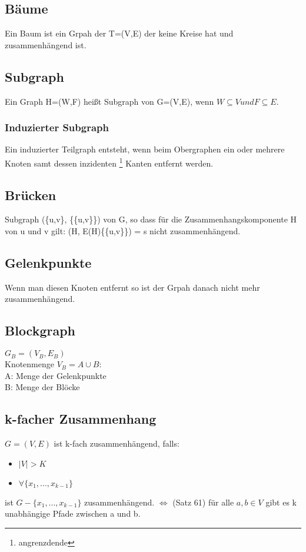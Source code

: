 \documentclass[12pt, letterpaper, twoside]{article}
\begin{document}
\subsection{Bäume}
Ein Baum ist ein Grpah der T=(V,E) der keine Kreise hat und zusammenhängend ist. 

\subsection{Subgraph}
Ein Graph H=(W,F) heißt Subgraph von G=(V,E), wenn $ W \subseteq V und F \subseteq E $.

\subsubsection{Induzierter Subgraph}
Ein induzierter Teilgraph entsteht, wenn beim Obergraphen ein oder mehrere Knoten samt dessen inzidenten \footnote{angrenzdende} Kanten entfernt werden. 

\subsection{Brücken}
Subgraph (\{u,v\}, \{\{u,v\}\}) von G, so dass für die Zusammenhangskomponente H von u und v gilt: (H, E(H)\{\{u,v\}\}) = s nicht zusammenhängend.

\subsection{Gelenkpunkte}
Wenn man diesen Knoten entfernt so ist der Grpah danach nicht mehr zusammenhängend.

\subsection{Blockgraph}
$ G_B =( V_B, E_B) $ \\
Knotenmenge $V_B = A \cup B$: \\
A: Menge der Gelenkpunkte \\
B: Menge der Blöcke

\subsection{k-facher Zusammenhang}
$ G=(V,E) $ ist k-fach zusammenhängend, falls:
	\begin{itemize}
		\item $|V|>K$
		\item $\forall \{x_1,...,x_{k-1}\} $
	\end{itemize}
	ist $G-\{x_1,...,x_{k-1}\}$ zusammenhängend.
	$\Leftrightarrow $ (Satz 61) für alle $a,b \in V$ gibt es k unabhängige Pfade zwischen a und b.
\end{document}
